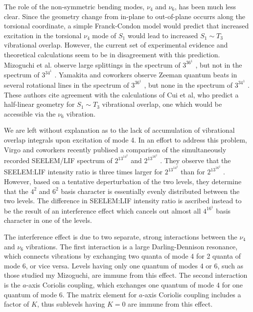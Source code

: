 \documentclass[12pt]{mitthesis}
\begin{document}
The role of the non-symmetric bending modes, $\nu_4$ and $\nu_6$, has
been much less clear.  Since the geometry change from in-plane to
out-of-plane occurrs along the torsional coordinate, a simple
Franck-Condon model would predict that increased excitation in the
torsional $\nu_4$ mode of $S_1$ would lead to increased $S_1 \sim T_3$
vibrational overlap.  However, the current set of experimental
evidence and theoretical calculations seem to be in disagreement with
this prediction.  Mizoguchi et al. observe large splittings in the
spectrum of $3^36^1$ , but not in the spectrum of $3^34^1$
.  Yamakita and coworkers observe Zeeman quantum beats in
several rotational lines in the spectrum of $3^36^1$ , but none
in the spectrum of $3^34^1$ .  These authors cite agreement with
the calculations of Cui et al, who predict a half-linear geometry for $S_1 \sim
T_3$ vibrational overlap, one which would be accessible via the $\nu_6$
vibration.

We are left without explanation as to the lack of accumulation of
vibrational overlap integrals upon excitation of mode 4.  In an effort
to address this problem, Virgo and coworkers recently publised a
comparison of the simultaneously recorded SEELEM/LIF spectrum of
$2^13^14^2$  and $2^13^16^2$ .  They observe that the
SEELEM:LIF intensity ratio is three times larger for $2^13^14^2$
 than for $2^13^16^2$ .  However, based on a tentative
deperturbation of the two levels, they determine that the $4^2$ and
$6^2$ basis character is essentially evenly distributed between the
two levels.  The difference in SEELEM:LIF intensity ratio is ascribed
instead to be the result of an interference effect which cancels out
almost all $4^16^1$ basis character in one of the levels.

The interference effect is due to two separate, strong interactions
between the $\nu_4$ and $\nu_6$ vibrations.  The first interaction is
a large Darling-Dennison resonance, which connects vibrations
by exchanging two quanta of mode 4 for 2 quanta of mode 6, or vice
versa.  Levels having only one quantum of modes 4 or 6, such as those
studied my Mizoguchi, are immune from this effect.  The second
interaction is the $a$-axis Coriolis coupling, which exchanges one
quantum of mode 4 for one quantum of mode 6.  The matrix element for 
$a$-axis Coriolis coupling includes a factor of $K$, thus sublevels
having $K=0$ are immune from this effect.
\end{document}

